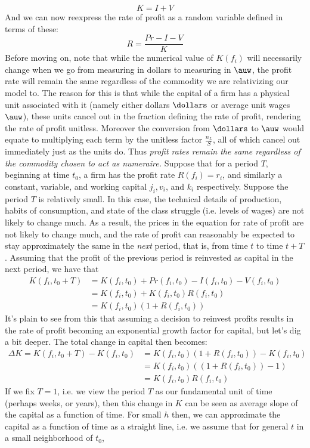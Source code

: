 \documentclass{article}
\theoremstyle{definition}
\theoremstyle{plain}
\theoremstyle{theorem}
\begin{document}
\[ K = I+V \]
And we can now reexpress the rate of profit as a random variable defined in terms of these:
\[ R = \frac{Pr-I-V}{K} \]
Before moving on, note that while the numerical value of $K(f_i)$ will necessarily change when we go from measuring in dollars to measuring in $\auw$, the profit rate will remain the same regardless of the commodity we are relativizing our model to. The reason for this is that while the capital of a firm has a physical unit associated with it (namely either dollars $\dollars$ or average unit wages $\auw$), these units cancel out in the fraction defining the rate of profit, rendering the rate of profit unitless. Moreover the conversion from $\dollars$ to $\auw$ would equate to multiplying each term by the unitless factor $\frac{n_L}{S}$, all of which cancel out immediately just as the units do. Thus \textit{profit rates remain the same regardless of the commodity chosen to act as numeraire.} 
Suppose that for a period $T$, beginning at time $t_0$, a firm has the profit rate $R(f_i) = r_i$, and similarly a constant, variable, and working capital $j_i,v_i$, and $k_i$ respectively. Suppose the period $T$ is relatively small. In this case, the technical details of production, habits of consumption, and state of the class struggle (i.e. levels of wages) are not likely to change much. As a result, the prices in the equation for rate of profit are not likely to change much, and the rate of profit can reasonably be expected to stay approximately the same in the \textit{next} period, that is, from time $t$ to time $t+T$. Assuming that the profit of the previous period is reinvested as capital in the next period, we have that \begin{align}
	K(f_i,t_0+T) &= K(f_i,t_0)+Pr(f_i,t_0)-I(f_i,t_0)-V(f_i,t_0) \\
			&= K(f_i,t_0) + K(f_i,t_0)R(f_i,t_0) \\
			&= K(f_i,t_0)(1+R(f_i,t_0))
\end{align}
It's plain to see from this that assuming a decision to reinvest profits results in the rate of profit becoming an exponential growth factor for capital, but let's dig a bit deeper. The total change in capital then becomes:
\begin{align}
	\Delta K = K(f_i,t_0+T)-K(f_i,t_0) &= K(f_i,t_0)(1+R(f_i,t_0))-K(f_i,t_0) \\
	&= K(f_i,t_0)((1+R(f_i,t_0))-1) \\
	&= K(f_i,t_0)R(f_i,t_0)
\end{align}
If we fix $T=1$, i.e. we view the period $T$ as our fundamental unit of time (perhaps weeks, or years), then this change in $K$ can be seen as average slope of the capital as a function of time. For small $h$ then, we can approximate the capital as a function of time as a straight line, i.e. we assume that for general $t$ in a small neighborhood of $t_0$, 
\end{document}
